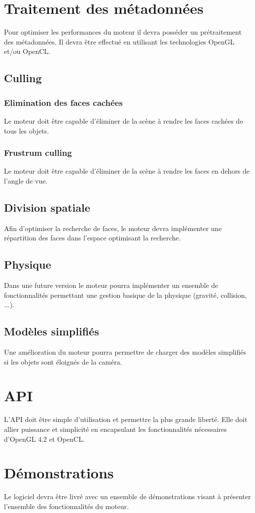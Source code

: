 \documentclass [a4 paper,11pt]{article}
\begin{document}
\section{Traitement des métadonnées}
Pour optimiser les performances du moteur il devra posséder un prétraitement des métadonnées.
Il devra être effectué en utilisant les technologies OpenGL et/ou OpenCL.

\subsection{Culling}
\subsubsection*{Elimination des faces cachées}
Le moteur doit être capable d'éliminer de la scène à rendre les faces cachées de tous les objets.
\subsubsection*{Frustrum culling}
Le moteur doit être capable d'éliminer de la scène à rendre les faces en dehors de l'angle de vue.

\subsection{Division spatiale}
Afin d'optimiser la recherche de faces, le moteur devra implémenter une répartition des faces dans l'espace optimisant la recherche.

\subsection{Physique}
Dans une future version le moteur pourra implémenter un ensemble de fonctionnalités permettant une gestion basique de la physique (gravité, collision, ...).

\subsection{Modèles simplifiés}
Une amélioration du moteur pourra permettre de charger des modèles simplifiés si les objets sont éloignés de la caméra.

\section{API}
L'API doit être simple d'utilisation et permettre la plus grande liberté.
Elle doit allier puissance et simplicité en encapsulant les fonctionnalités nécessaires d'OpenGL 4.2 et OpenCL.

\section{Démonstrations}
Le logiciel devra être livré avec un ensemble de démonstrations visant à présenter l'ensemble des fonctionnalités du moteur.
\end{document}

